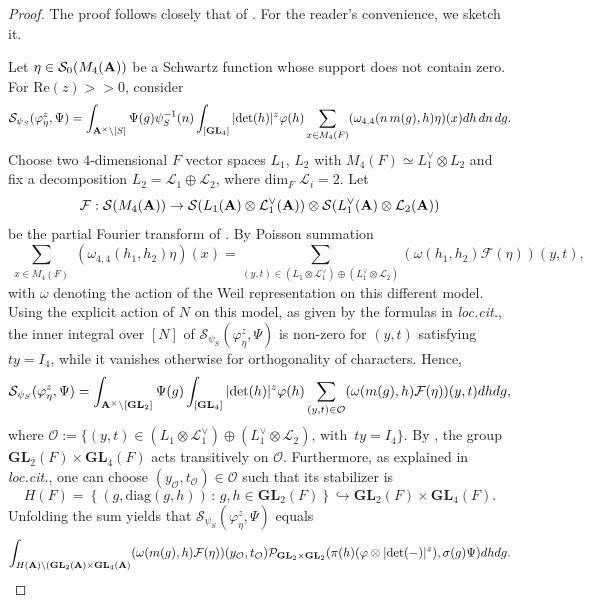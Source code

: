 \documentclass[11pt, reqno]{amsart}
\theoremstyle{plain}
\theoremstyle{definition}
\theoremstyle{remark}
\theoremstyle{plain}
\def\A{{\bf A}}
\def\det{\mathrm{det}}
\def\GL{\mathbf{GL}}
\begin{document}
\begin{proof}
    The proof follows closely that of \cite[Proposition 7.1]{Chen-Gan}. For the reader's convenience, we sketch it.
    
      Let $\eta \in \mathcal{S}_0(M_4(\A))$ be a Schwartz function whose support does not contain zero. For $\mathrm{Re}(z)>>0$, consider
    \[\mathcal{S}_{\psi_S}({\varphi_\eta^z,\Psi})= \int_{\A^\times \backslash[S]}\Psi(g)\psi_S^{-1}(n)\int_{[\GL_4]}|\det(h)|^z\varphi(h)\sum_{\substack{x\in M_{4}(F)}}(\omega_{4,4}(n\, m(g),h)\eta)(x)dh\,dn \,dg.\]
    Choose two $4$-dimensional $F$ vector spaces $L_1$, $L_2$ with $M_{4}(F)\simeq L_1^\vee \otimes L_2$ and fix a decomposition $L_2 = \mathcal{L}_1\oplus \mathcal{L}_2$, where $\mathrm{dim}_F\;\mathcal{L}_i = 2$. Let
    \[\mathcal{F}:\mathcal{S}(M_{4}(\A))\to \mathcal{S}(L_1(\A)\otimes \mathcal{L}_1^{\vee}(\A))\otimes \mathcal{S}(L_1^{\vee}(\A)\otimes \mathcal{L}_2(\A))\]
    be the partial Fourier transform of \cite[\S 3.2]{GanPeriodsandTheta}. By Poisson summation
    \[\sum_{\substack{x\in M_{4}(F)}}(\omega_{4,4}(h_1,h_2)\eta)(x) = \sum_{(y,t)\in (L_1\otimes \mathcal{L}_1^{\vee})\oplus (L_1^{\vee}\otimes \mathcal{L}_2)}(\omega(h_1,h_2)\mathcal{F}(\eta))(y,t),\]
    with $\omega$ denoting the action of the Weil representation on this different model. Using the explicit action of $N$ on this model, as given by the formulas in \textit{loc.cit.}, the inner integral over $[N]$ of $\mathcal{S}_{\psi_S}({\varphi_\eta^z,\Psi})$ is non-zero for $(y,t)$ satisfying $ty = I_4$, while it vanishes otherwise for orthogonality of characters. Hence,
    \[\mathcal{S}_{\psi_S}({\varphi_\eta^z,\Psi}) = \int_{\A^{\times}\setminus[\GL_2]}\Psi(g)\int_{[\GL_4]}|\det(h)|^z\varphi(h)\sum_{\substack{(y,t)\in \mathcal{O}}}(\omega(m(g),h)\mathcal{F}(\eta))(y,t)dhdg,\]
    where $\mathcal{O} := \{(y,t)\in (L_1\otimes \mathcal{L}_1^{\vee})\oplus (L_1^{\vee}\otimes \mathcal{L}_2),\,\text{with }\,ty = I_4\}$. By \cite[\S 3.3]{GanPeriodsandTheta}, the group $\GL_2(F)\times \GL_4(F)$ acts transitively on $\mathcal{O}$. Furthermore, as explained in \emph{loc.cit.}, one can choose $(y_\mathcal{O},t_\mathcal{O})\in \mathcal{O}$ such that its stabilizer is $$H(F) = \left\{ (g,  \mathrm{diag}(g,h))\,:\, g,h \in \GL_2(F) \right\} \hookrightarrow \GL_2(F)\times \GL_4(F).$$
    Unfolding the sum yields that $\mathcal{S}_{\psi_S}({\varphi_\eta^z,\Psi})$ equals 
    \begin{align}\label{eq_final_Shal}
        \int_{H(\A)\setminus (\GL_2(\A)\times \GL_4(\A)}(\omega(m(g),h)\mathcal{F}(\eta))(y_\mathcal{O},t_\mathcal{O})\mathcal{P}_{\GL_2\times\GL_2}(\pi(h)(\varphi \otimes|\det(-)|^z),\sigma(g)\Psi)dhdg.

\end{align}
\end{proof}
\end{document}
